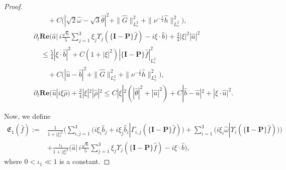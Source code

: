 \documentclass[reqno,11pt]{amsart}
\theoremstyle{plain}
\numberwithin{equation}{section}
\begin{document}
\begin{proof}
\begin{align}
&\qquad  +C\big(|\sqrt{2} \hat{\omega}-\sqrt{3} \hat{\theta}|^2+\|\hat{G}\|_{L_v^2}^2+\|\nu^{-\frac{1}{2}} \hat{h}\|_{L_v^2}^2\big), \\ \label{G5.14}
& \partial_t \mathbf{Re}\Big(\hat{a} \Big\lvert\, i 
\frac{\sqrt{6}}{5} \sum_{j=1}^3 \xi_j \Upsilon_j(\{\mathbf{I}-\mathbf{P}\} 
\hat{f})-i \xi \cdot \hat{b}\Big)+\frac{3}{4}|\xi|^2|\hat{a}|^2  \nonumber\\
&\quad\leq \frac{5}{4}|\xi \cdot \hat{b}|^2 +C (1+|\xi|^2 )|\{\mathbf{I}-\mathbf{P}\} \hat{f}|_{L_v^2}^2\nonumber\\
& \qquad+C\big(|\hat{u}-\hat{b}|^2+\|\hat{G}\|_{L_v^2}^2+\|\nu^{-\frac{1}{2}} \hat{h}\|_{L_v^2}^2\big),  \\\label{G5.15}
& \partial_t \mathbf{Re}(\hat{u}|i \xi \hat{\rho})
+\frac{3}{4}|\xi|^2|\hat{\rho}|^2 \leq C|\xi|^2 (|\hat{\theta}|^2
+|\hat{u}|^2 )+C|\hat{b}-\hat{u}|^2+|\xi\cdot\hat{u}|^2 . 
\end{align}

Now, we define 
\begin{align}\label{G5.16}
 {\mathfrak{E}}_1(\hat{f}):= & \frac{1}{1+|\xi|^2}\Big(\sum_{i, j=1}^3
\big(i \xi_i \hat{b}_j+i \xi_j \hat{b}_i|\Gamma_{i, j}(\{\mathbf{I}-\mathbf{P}\} \hat{f})\big)+\sum_{i=1}^3\big( i \xi_i \hat{\omega}|\Upsilon_i(\{\mathbf{I}-\mathbf{P}\} \hat{f})\big)\Big)
\nonumber\\
& 
+\frac{\iota_1}{1+|\xi|^2}\Big(\hat{a} \Big\lvert\, i \frac{\sqrt{6}}{5} \sum_{j=1}^3 \xi_j \Upsilon_j(\{\mathbf{I}-\mathbf{P}\} 
\hat{f})-i \xi \cdot \hat{b} \Big) ,
\end{align}
where $0<\iota_1\ll 1$ is a constant.


\end{proof}
\end{document}
